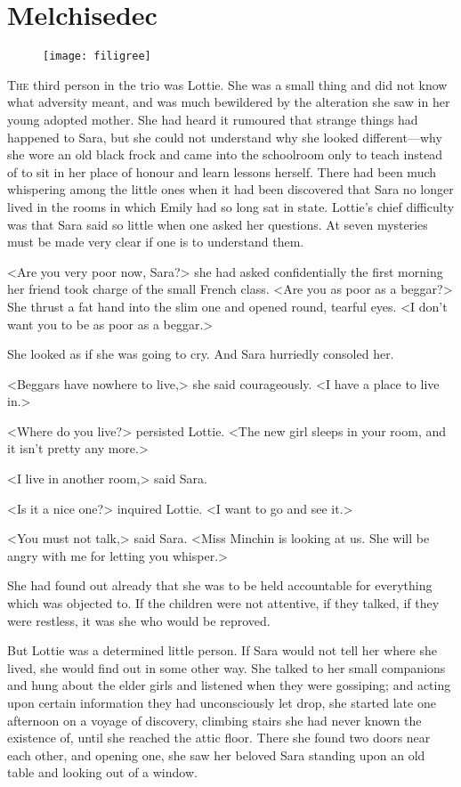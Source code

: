 \chapter{Melchisedec}

\begin{figure}[t!]
\centering
\texttt{[image: filigree]}
\end{figure}

\lettrine[lines=5]{T}{he} third person in the trio was Lottie. She was a small thing and did not know what adversity meant, and was much bewildered by the alteration she saw in her young adopted mother. She had heard it rumoured that strange things had happened to Sara, but she could not understand why she looked different—why she wore an old black frock and came into the schoolroom only to teach instead of to sit in her place of honour and learn lessons herself. There had been much whispering among the little ones when it had been discovered that Sara no longer lived in the rooms in which Emily had so long sat in state. Lottie's chief difficulty was that Sara said so little when one asked her questions. At seven mysteries must be made very clear if one is to understand them.

<Are you very poor now, Sara?> she had asked confidentially the first morning her friend took charge of the small French class. <Are you as poor as a beggar?> She thrust a fat hand into the slim one and opened round, tearful eyes. <I don't want you to be as poor as a beggar.>

She looked as if she was going to cry. And Sara hurriedly consoled her.

<Beggars have nowhere to live,> she said courageously. <I have a place to live in.>

<Where do you live?> persisted Lottie. <The new girl sleeps in your room, and it isn't pretty any more.>

<I live in another room,> said Sara.

<Is it a nice one?> inquired Lottie. <I want to go and see it.>

<You must not talk,> said Sara. <Miss Minchin is looking at us. She will be angry with me for letting you whisper.>

She had found out already that she was to be held accountable for everything which was objected to. If the children were not attentive, if they talked, if they were restless, it was she who would be reproved.

But Lottie was a determined little person. If Sara would not tell her where she lived, she would find out in some other way. She talked to her small companions and hung about the elder girls and listened when they were gossiping; and acting upon certain information they had unconsciously let drop, she started late one afternoon on a voyage of discovery, climbing stairs she had never known the existence of, until she reached the attic floor. There she found two doors near each other, and opening one, she saw her beloved Sara standing upon an old table and looking out of a window.

